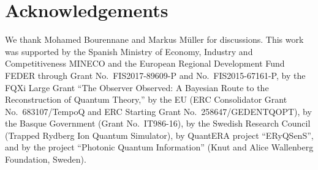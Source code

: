 \documentclass[12pt,
onecolumn,
superscriptaddress,
floatfix,
]{revtex4-2}
\begin{document}
\section{Acknowledgements}

We thank Mohamed Bourennane and Markus Müller for discussions.
This work was supported by
the Spanish Ministry of Economy, Industry and Competitiveness MINECO and
the European Regional Development Fund FEDER through Grant No.\ FIS2017-89609-P 
 and No.\ FIS2015-67161-P,
by the FQXi Large Grant ``The Observer Observed: A Bayesian Route to the 
Reconstruction of Quantum Theory,''
by the EU (ERC Consolidator Grant No.\ 683107/TempoQ and
ERC Starting Grant No.\ 258647/GEDENTQOPT),
by the Basque Government (Grant No.\ IT986-16), by the Swedish Research Council (Trapped Rydberg Ion Quantum Simulator), by QuantERA project ``ERyQSenS'',
and by the project ``Photonic Quantum Information'' (Knut and Alice Wallenberg 
Foundation, Sweden).
\end{document}
